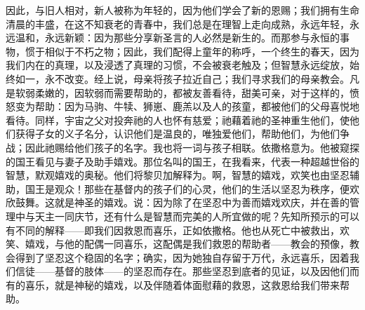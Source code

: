 因此，与旧人相对，新人被称为年轻的，因为他们学会了新的恩赐；我们拥有生命清晨的丰盛，在这不知衰老的青春中，我们总是在理智上走向成熟，永远年轻，永远温和，永远新颖：因为那些分享新圣言的人必然是新生的。而那参与永恒的事物，惯于相似于不朽之物；因此，我们配得上童年的称呼，一个终生的春天，因为我们内在的真理，以及浸透了真理的习惯，不会被衰老触及；但智慧永远绽放，始终如一，永不改变。经上说，母亲将孩子拉近自己；我们寻求我们的母亲教会。凡是软弱柔嫩的，因软弱而需要帮助的，都被友善看待，甜美可亲，对于这样的，愤怒变为帮助：因为马驹、牛犊、狮崽、鹿羔以及人的孩童，都被他们的父母喜悦地看待。同样，宇宙之父对投奔祂的人也怀有慈爱；祂藉着祂的圣神重生他们，使他们获得子女的义子名分，认识他们是温良的，唯独爱他们，帮助他们，为他们争战；因此祂赐给他们孩子的名字。我也将一词与孩子相联。依撒格意为。他被窥探的国王看见与妻子及助手嬉戏。那位名叫的国王，在我看来，代表一种超越世俗的智慧，默观嬉戏的奥秘。他们将黎贝加解释为。啊，智慧的嬉戏，欢笑也由坚忍辅助，国王是观众！那些在基督内的孩子们的心灵，他们的生活以坚忍为秩序，便欢欣鼓舞。这就是神圣的嬉戏。说：因为除了在坚忍中为善而嬉戏欢庆，并在善的管理中与天主一同庆节，还有什么是智慧而完美的人所宜做的呢？先知所预示的可以有不同的解释——即我们因救恩而喜乐，正如依撒格。他也从死亡中被救出，欢笑、嬉戏，与他的配偶一同喜乐，这配偶是我们救恩的帮助者——教会的预像，教会得到了坚忍这个稳固的名字；确实，因为她独自存留于万代，永远喜乐，因着我们信徒——基督的肢体——的坚忍而存在。那些坚忍到底者的见证，以及因他们而有的喜乐，就是神秘的嬉戏，以及伴随着体面慰藉的救恩，这救恩给我们带来帮助。\par

